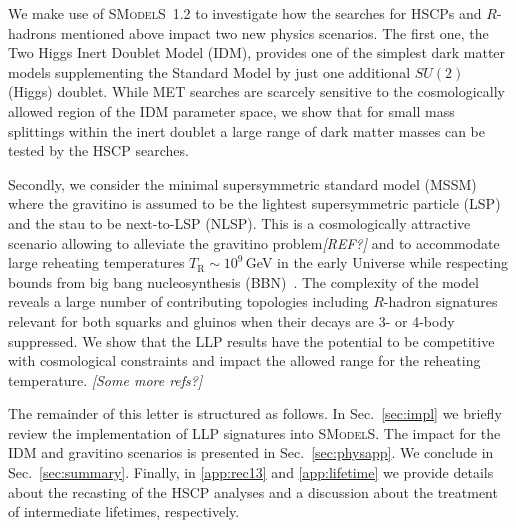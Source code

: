 \documentclass[preprint,number,sort&compress,twocolumn,3p]{elsstyarticle}
\newcommand{\smo}{\textsc{SModelS}}
\newcommand{\com}[1]{\emph{\color{red}[#1]}}  %
\begin{document}

We make use of \smo~1.2 to investigate how the searches for HSCPs and $R$-hadrons mentioned above impact two new physics scenarios. 
The first one, the Two Higgs Inert Doublet Model (IDM), provides one of the simplest dark matter models supplementing the Standard Model by just one additional $SU(2)$ (Higgs) doublet. 
While MET searches are scarcely sensitive to the cosmologically allowed region of the IDM parameter space, 
we show that for small mass splittings within the inert doublet a large range of dark matter masses
can be tested by the HSCP searches.

Secondly, we consider the minimal supersymmetric standard model (MSSM) 
where the gravitino is assumed to be the lightest supersymmetric particle (LSP) and the stau to be next-to-LSP (NLSP). This is a cosmologically attractive scenario allowing to alleviate the gravitino problem\com{REF?} and to accommodate large reheating temperatures $T_\text{R}\sim10^9\,$GeV
in the early Universe while respecting bounds from big bang nucleosynthesis (BBN)~\cite{}.
The complexity of the model reveals a large number of contributing topologies including
$R$-hadron signatures relevant for both squarks and gluinos when their decays are 3- or 4-body suppressed.
We show that the LLP results have the potential to be competitive with cosmological constraints and impact the allowed range for the reheating temperature.
\com{Some more refs?}


The remainder of this letter is structured as follows. In Sec.~\ref{sec:impl} we briefly
review the implementation of LLP signatures into \smo. The impact for the 
IDM and gravitino scenarios is presented in Sec.~\ref{sec:physapp}. 
We conclude in Sec.~\ref{sec:summary}.
Finally, in \ref{app:rec13} and \ref{app:lifetime} we provide details about the recasting of the HSCP analyses 
and a discussion about the treatment of intermediate lifetimes, respectively.
\end{document}
